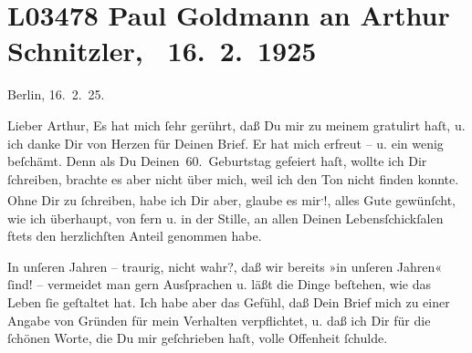 

\section[ Paul Goldmann an Arthur Schnitzler, 16. 2. 1925]{L03478 Paul Goldmann an Arthur Schnitzler,  16. 2. 1925}
\nopagebreak{}
\rehead{ }\normalsize\beginnumbering{}
\toendnotes[C]{\smallbreak\pagebreak[2]}
\toendnotes[C]{\smallbreak}
\toendnotes[C]{\smallbreak}
\pstart
           {\pb}Berlin, 16. 2. 25.\pend
           
\pstart{}Lieber Arthur,\pend\vspace{0.5em}
\pstart
           Es hat mich{ }ſehr gerührt, daß Du mir zu meinem \label{K_L03478-1v}\label{K_L03478-1} gratulirt haſt, u. ich danke Dir von Herzen für Deinen Brief. Er hat mich
               erfreut – u. ein wenig beſchämt. Denn als Du \label{K_L03478-2v}\label{K_L03478-2} Deinen 60. Geburtstag gefeiert haſt, wollte ich Dir{ }ſchreiben, brachte es
               aber nicht über mich, weil ich den Ton nicht finden konnte. Ohne Dir zu{ }ſchreiben,
               habe ich Dir aber, glaube es mir\substVorne{}\textsuperscript{,}\substDazwischen{}!\substHinten{}, alles Gute gewünſcht, wie ich überhaupt, von fern {\pb}u. in  der
               Stille, an allen Deinen Lebensſchickſalen ftets den herzlichſten Anteil genommen
               habe.\pend
           
\pstart
           In unſeren Jahren – traurig, nicht wahr?, daß wir bereits »in unſeren Jahren«{ }ſind! –
               vermeidet man gern Ausſprachen u. läßt die Dinge beſtehen, wie das Leben{ }ſie
               geſtaltet hat. Ich habe aber das Gefühl, daß Dein Brief mich zu einer Angabe von
               Gründen für mein Verhalten verpflichtet, u. daß ich Dir für die{ }ſchönen Worte, die Du
               mir geſchrieben haſt, volle Offenheit{ }ſchulde.\pend
           
